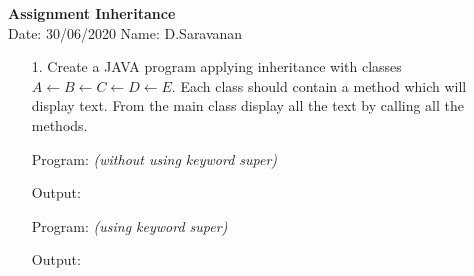 \documentclass[a4paper,11pt,openright]{report}
\begin{document}
\singlespacing
\pagestyle{plain}

\begin{center}
\textbf{Assignment Inheritance} \\
Date: 30/06/2020 \hspace{2mm} Name: D.Saravanan
\end{center}

\vspace{10px}

\begin{enumerate}

\item[1.] Create a JAVA program applying inheritance with classes $A \leftarrow B \leftarrow
C \leftarrow D \leftarrow E$. Each class should contain a method which will display text.
From the main class display all the text by calling all the methods. 

\vspace{1cm}

Program: \textit{(without using keyword super)}



Output:



\vspace{1cm}

Program: \textit{(using keyword super)}



\vspace{0.5cm}

Output:



\end{enumerate}
\end{document}
